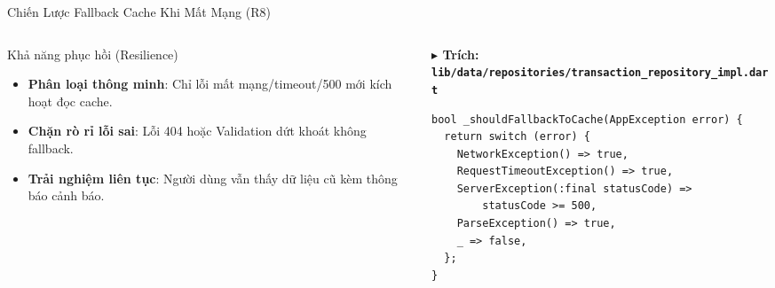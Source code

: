 \documentclass[aspectratio=169, 10pt]{beamer}
\newcommand{\speakerB}{\hfill\tcbox[colback=NavyPrimary,colframe=NavyPrimary,boxsep=1pt,left=3pt,right=3pt,top=1pt,bottom=1pt]{\tiny\bfseries\color{white}SV B: Phạm Nhung}}
\begin{document}
\begin{frame}[fragile]{Chiến Lược Fallback Cache Khi Mất Mạng (R8) \speakerB}
  \begin{columns}[c]
    \begin{column}{0.46\textwidth}
      \begin{infobox}[EmeraldGreen]{Khả năng phục hồi (Resilience)}
        \begin{itemize}\setlength{\itemsep}{3pt}\scriptsize
          \item \textbf{Phân loại thông minh}: Chỉ lỗi mất mạng/timeout/500 mới kích hoạt đọc cache.
          \item \textbf{Chặn rò rỉ lỗi sai}: Lỗi 404 hoặc Validation dứt khoát không fallback.
          \item \textbf{Trải nghiệm liên tục}: Người dùng vẫn thấy dữ liệu cũ kèm thông báo cảnh báo.
        \end{itemize}
      \end{infobox}
    \end{column}

    \begin{column}{0.54\textwidth}
\vspace{1mm}
{\scriptsize\bfseries\color{NavyPrimary} $\blacktriangleright$ Trích: \texttt{lib/data/repositories/transaction_repository_impl.dart}}\\[1mm]
\begin{lstlisting}
bool _shouldFallbackToCache(AppException error) {
  return switch (error) {
    NetworkException() => true,
    RequestTimeoutException() => true,
    ServerException(:final statusCode) => 
        statusCode >= 500,
    ParseException() => true,
    _ => false,
  };
}
\end{lstlisting}
    \end{column}
  \end{columns}
\end{frame}
\end{document}
